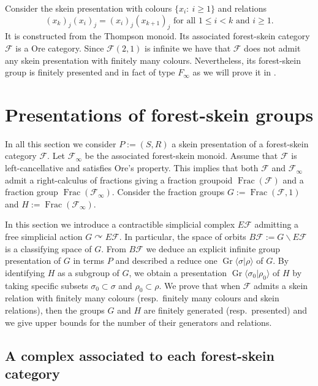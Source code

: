 \documentclass[a4paper, 12pt]{amsart}
\numberwithin{equation}{section}
\theoremstyle{definition}
\newcommand{\act}{\curvearrowright}
\newcommand{\bs}{\backslash}
\newcommand{\cF}{\mathcal F}
\DeclareMathOperator{\Frac}{Frac}
\DeclareMathOperator{\Gr}{Gr}
\newcommand{\la}{\langle}
\newcommand{\ra}{\rangle}
\begin{document}
Consider the skein presentation with colours $\{x_i:\ i\geq 1\}$ and relations
$$(x_k)_j (x_i)_j = (x_i)_j(x_{k+1})_j \text{ for all } 1\leq i<k \text{ and } i\geq 1.$$
It is constructed from the Thompson monoid.
Its associated forest-skein category $\cF$ is a Ore category. Since $\cF(2,1)$ is infinite we have that $\cF$ does not admit any skein presentation with finitely many colours. 
Nevertheless, its forest-skein group is finitely presented and in fact of type $F_\infty$ as we will prove it in \cite{Brothier22-HPM}.

\section{Presentations of forest-skein groups}\label{sec:presentation}

In all this section we consider $P:=(S,R)$ a skein presentation of a forest-skein category $\cF$.
Let $\cF_\infty$ be the associated forest-skein monoid.
Assume that $\cF$ is left-cancellative and satisfies Ore's property. 
This implies that both $\cF$ and $\cF_\infty$ admit a right-calculus of fractions giving a fraction groupoid $\Frac(\cF)$ and a fraction group $\Frac(\cF_\infty)$.
Consider the fraction groups $G:=\Frac(\cF,1)$ and $H:=\Frac(\cF_\infty)$.

In this section we introduce a contractible simplicial complex $E\cF$ admitting a free simplicial action $G\act E\cF$.
In particular, the space of orbits $B\cF:=G\bs E\cF$ is a classifying space of $G$.
From $B\cF$ we deduce an explicit infinite group presentation of $G$ in terms $P$ and described a reduce one
$\Gr\la \sigma|\rho\ra$ of $G$.
By identifying $H$ as a subgroup of $G$, we obtain a presentation $\Gr\la \sigma_0|\rho_0\ra$ of $H$ by taking specific subsets $\sigma_0\subset \sigma$ and $\rho_0\subset \rho.$
We prove that when $\cF$ admits a skein relation with finitely many colours (resp.~finitely many colours and skein relations), then the groups $G$ and $H$ are finitely generated (resp.~presented) and we give upper bounds for the number of their generators and relations.

\subsection{A complex associated to each forest-skein category}\label{sec:complex}
\end{document}
